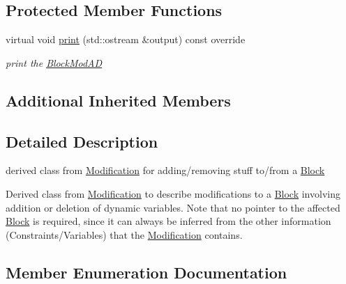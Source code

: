 \subsection*{Protected Member Functions}
\begin{DoxyCompactItemize}
\item 
\mbox{\label{class_s_m_spp__di__unipi__it_1_1_block_mod_a_d_a59a9fcbf8f9f86d348344b2073644b0e}} 
virtual void \mbox{\hyperlink{class_s_m_spp__di__unipi__it_1_1_block_mod_a_d_a59a9fcbf8f9f86d348344b2073644b0e}{print}} (std\+::ostream \&output) const override
\begin{DoxyCompactList}\small\item\em print the \mbox{\hyperlink{class_s_m_spp__di__unipi__it_1_1_block_mod_a_d}{Block\+Mod\+AD}} \end{DoxyCompactList}\end{DoxyCompactItemize}
\subsection*{Additional Inherited Members}


\subsection{Detailed Description}
derived class from \mbox{\hyperlink{class_s_m_spp__di__unipi__it_1_1_modification}{Modification}} for adding/removing stuff to/from a \mbox{\hyperlink{class_s_m_spp__di__unipi__it_1_1_block}{Block}} 

Derived class from \mbox{\hyperlink{class_s_m_spp__di__unipi__it_1_1_modification}{Modification}} to describe modifications to a \mbox{\hyperlink{class_s_m_spp__di__unipi__it_1_1_block}{Block}} involving addition or deletion of dynamic variables. Note that no pointer to the affected \mbox{\hyperlink{class_s_m_spp__di__unipi__it_1_1_block}{Block}} is required, since it can always be inferred from the other information (Constraints/\+Variables) that the \mbox{\hyperlink{class_s_m_spp__di__unipi__it_1_1_modification}{Modification}} contains. 

\subsection{Member Enumeration Documentation}
\mbox{\label{class_s_m_spp__di__unipi__it_1_1_block_mod_a_d_a13aa94d77ea3e294f217c290a99d8062}} 
